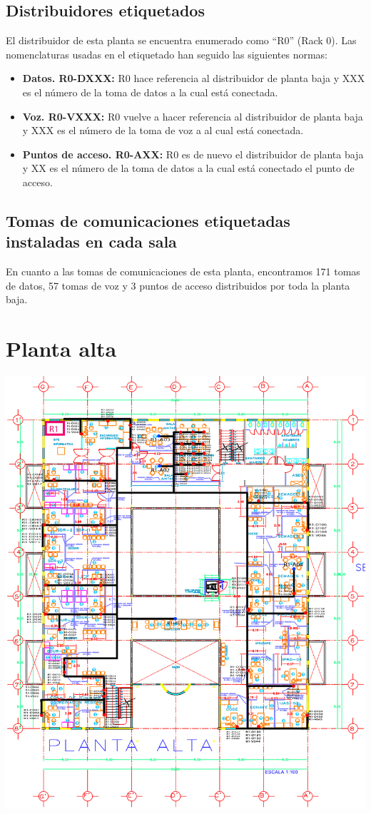 \subsection{Distribuidores etiquetados}
El distribuidor de esta planta se encuentra enumerado como ``R0'' (Rack 0). Las nomenclaturas usadas en el etiquetado han seguido las siguientes normas:
\begin{itemize}
	\item \textbf{Datos. R0-DXXX:} R0 hace referencia al distribuidor de planta baja y XXX es el número de la toma de datos a la cual está conectada.
	\item \textbf{Voz. R0-VXXX:} R0 vuelve a hacer referencia al distribuidor de planta baja y XXX es el número de la toma de voz a al cual está conectada.
	\item \textbf{Puntos de acceso. R0-AXX:} R0 es de nuevo el distribuidor de planta baja y XX es el número de la toma de datos a la cual está conectado el punto de acceso.
\end{itemize}

\subsection{Tomas de comunicaciones etiquetadas instaladas en cada sala}
En cuanto a las tomas de comunicaciones de esta planta, encontramos 171 tomas de datos, 57 tomas de voz y 3 puntos de acceso distribuidos por toda la planta baja.

\newpage
\section{Planta alta}
\begin{center}
	\includegraphics[scale=1.3]{CHPA.png}
\end{center}

